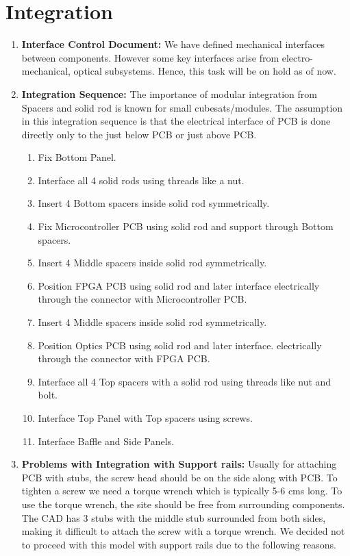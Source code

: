 \documentclass[../../main.tex]{subfiles}
\begin{document}
\section{Integration}
\begin{enumerate}
    \item \textbf{Interface Control Document:} We have defined mechanical interfaces between components. However some key interfaces arise from electro-mechanical, optical subsystems. Hence, this task will be on hold as of now.
    \item \textbf{Integration Sequence:} The importance of modular integration from Spacers and solid rod is known for small cubesats/modules. The assumption in this integration sequence is that the electrical interface of PCB is done directly only to the just below PCB or just above PCB.
    \begin{enumerate}
        \item Fix Bottom Panel.
        \item Interface all 4 solid rods using threads like a nut.
        \item Insert 4 Bottom spacers inside solid rod symmetrically.
        \item Fix Microcontroller PCB using solid rod and support through Bottom spacers.
        \item Insert 4 Middle spacers inside solid rod symmetrically.
        \item Position FPGA PCB using solid rod and later interface electrically through the connector with Microcontroller PCB.
        \item Insert 4 Middle spacers inside solid rod symmetrically.
        \item Position Optics PCB using solid rod and later interface. electrically through the connector with FPGA PCB.
        \item Interface all 4 Top spacers with a solid rod using threads like nut and bolt.
        \item Interface Top Panel with Top spacers using screws.
        \item Interface Baffle and Side Panels.
    \end{enumerate}
    \item \textbf{Problems with Integration with Support rails:} Usually for attaching PCB with stubs, the screw head should be on the side along with PCB. To tighten a screw we need a torque wrench which is typically 5-6 cms long. To use the torque wrench, the site should be free from surrounding components. The CAD has 3 stubs with the middle stub surrounded from both sides, making it difficult to attach the screw with a torque wrench. We decided not to proceed with this model with support rails due to the following reasons.

\end{enumerate}
\end{document}
